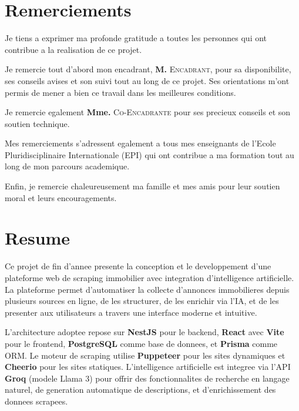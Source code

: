 \documentclass[12pt,a4paper]{report}
\newcommand{\tech}[1]{\textbf{#1}}
\begin{document}
\chapter*{Remerciements}

\vspace*{1cm}

Je tiens a exprimer ma profonde gratitude a toutes les personnes qui ont contribue a la realisation de ce projet.

Je remercie tout d'abord mon encadrant, \textbf{M.} \textsc{Encadrant}, pour sa disponibilite, ses conseils avises et son suivi tout au long de ce projet. Ses orientations m'ont permis de mener a bien ce travail dans les meilleures conditions.

Je remercie egalement \textbf{Mme.} \textsc{Co-Encadrante} pour ses precieux conseils et son soutien technique.

Mes remerciements s'adressent egalement a tous mes enseignants de l'Ecole Pluridisciplinaire Internationale (EPI) qui ont contribue a ma formation tout au long de mon parcours academique.

Enfin, je remercie chaleureusement ma famille et mes amis pour leur soutien moral et leurs encouragements.

\chapter*{Resume}

\vspace*{0.5cm}

Ce projet de fin d'annee presente la conception et le developpement d'une plateforme web de scraping immobilier avec integration d'intelligence artificielle. La plateforme permet d'automatiser la collecte d'annonces immobilieres depuis plusieurs sources en ligne, de les structurer, de les enrichir via l'IA, et de les presenter aux utilisateurs a travers une interface moderne et intuitive.

L'architecture adoptee repose sur \tech{NestJS} pour le backend, \tech{React} avec \tech{Vite} pour le frontend, \tech{PostgreSQL} comme base de donnees, et \tech{Prisma} comme ORM. Le moteur de scraping utilise \tech{Puppeteer} pour les sites dynamiques et \tech{Cheerio} pour les sites statiques. L'intelligence artificielle est integree via l'API \tech{Groq} (modele Llama 3) pour offrir des fonctionnalites de recherche en langage naturel, de generation automatique de descriptions, et d'enrichissement des donnees scrapees.
\end{document}
